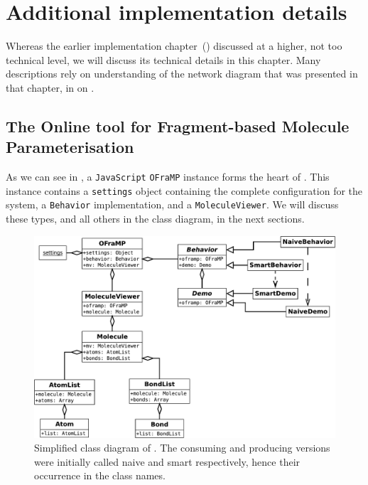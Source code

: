 \chapter[Additional implementation]{Additional implementation details}

Whereas the earlier implementation chapter~() discussed \oframp{} at a higher, not too technical level, we will discuss its technical details in this chapter. Many descriptions rely on understanding of the network diagram that was presented in that chapter, in  on .



\section[\oframp]{The Online tool for Fragment-based Molecule Parameterisation}
As we can see in , a \verb|JavaScript| \verb|OFraMP| instance forms the heart of \oframp. This instance contains a \verb|settings| object containing the complete configuration for the system, a \verb|Behavior| implementation, and a \verb|MoleculeViewer|. We will discuss these types, and all others in the class diagram, in the next sections.

\begin{figure}
\center
\includegraphics[width=\textwidth]{img/oframp_class.pdf}
\caption{Simplified class diagram of \oframp. The consuming and producing versions were initially called naive and smart respectively, hence their occurrence in the class names.}
\end{figure}


